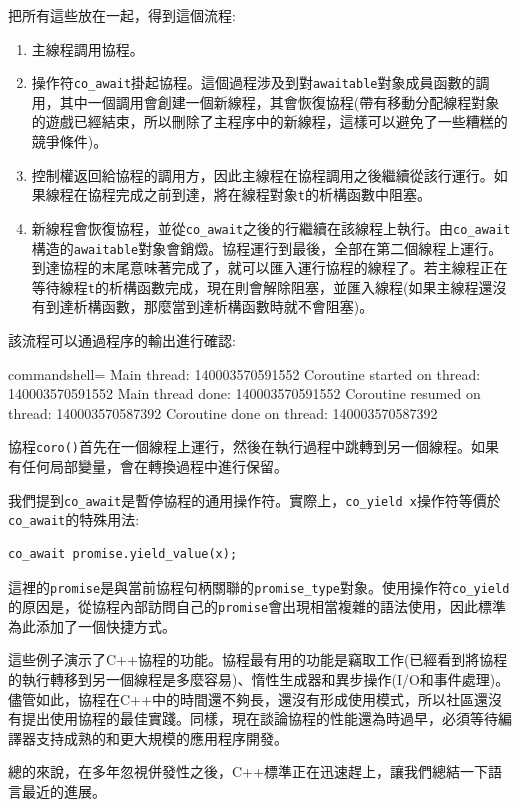 把所有這些放在一起，得到這個流程:

\begin{enumerate}
\item
主線程調用協程。

\item
操作符\texttt{co\_await}掛起協程。這個過程涉及到對\texttt{awaitable}對象成員函數的調用，其中一個調用會創建一個新線程，其會恢復協程(帶有移動分配線程對象的遊戲已經結束，所以刪除了主程序中的新線程，這樣可以避免了一些糟糕的競爭條件)。

\item
控制權返回給協程的調用方，因此主線程在協程調用之後繼續從該行運行。如果線程在協程完成之前到達，將在線程對象\texttt{t}的析構函數中阻塞。

\item 
新線程會恢復協程，並從\texttt{co\_await}之後的行繼續在該線程上執行。由\texttt{co\_await}構造的\texttt{awaitable}對象會銷燬。協程運行到最後，全部在第二個線程上運行。到達協程的末尾意味著完成了，就可以匯入運行協程的線程了。若主線程正在等待線程\texttt{t}的析構函數完成，現在則會解除阻塞，並匯入線程(如果主線程還沒有到達析構函數，那麼當到達析構函數時就不會阻塞)。
\end{enumerate}

該流程可以通過程序的輸出進行確認:

\begin{tcblisting}{commandshell={}}
Main thread: 140003570591552
Coroutine started on thread: 140003570591552
Main thread done: 140003570591552
Coroutine resumed on thread: 140003570587392
Coroutine done on thread: 140003570587392
\end{tcblisting}

協程\texttt{coro()}首先在一個線程上運行，然後在執行過程中跳轉到另一個線程。如果有任何局部變量，會在轉換過程中進行保留。

我們提到\texttt{co\_await}是暫停協程的通用操作符。實際上，\texttt{co\_yield x}操作符等價於\texttt{co\_await}的特殊用法:

\begin{lstlisting}[style=styleCXX]
co_await promise.yield_value(x);
\end{lstlisting}

這裡的\texttt{promise}是與當前協程句柄關聯的\texttt{promise\_type}對象。使用操作符\texttt{co\_yield}的原因是，從協程內部訪問自己的\texttt{promise}會出現相當複雜的語法使用，因此標準為此添加了一個快捷方式。

這些例子演示了C++協程的功能。協程最有用的功能是竊取工作(已經看到將協程的執行轉移到另一個線程是多麼容易)、惰性生成器和異步操作(I/O和事件處理)。儘管如此，協程在C++中的時間還不夠長，還沒有形成使用模式，所以社區還沒有提出使用協程的最佳實踐。同樣，現在談論協程的性能還為時過早，必須等待編譯器支持成熟的和更大規模的應用程序開發。 

總的來說，在多年忽視併發性之後，C++標準正在迅速趕上，讓我們總結一下語言最近的進展。









